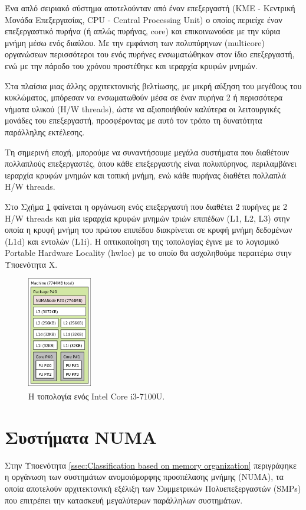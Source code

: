 Ένα απλό σειριακό σύστημα αποτελούνταν από έναν επεξεργαστή (ΚΜΕ - Κεντρική Μονάδα Επεξεργασίας, CPU - Central Processing Unit) ο οποίος περιείχε έναν επεξεργαστικό πυρήνα (ή απλώς πυρήνας, core) και επικοινωνούσε με την κύρια μνήμη μέσω ενός διαύλου. Με την εμφάνιση των πολυπύρηνων (multicore) οργανώσεων περισσότεροι του ενός πυρήνες ενσωματώθηκαν στον ίδιο επεξεργαστή, ενώ με την πάροδο του χρόνου προστέθηκε και ιεραρχία κρυφών μνημών.

Στα πλαίσια μιας άλλης αρχιτεκτονικής βελτίωσης, με μικρή αύξηση του μεγέθους του κυκλώματος, μπόρεσαν να ενσωματωθούν μέσα σε έναν πυρήνα 2 ή περισσότερα νήματα υλικού (H/W threads), ώστε να αξιοποιήθούν καλύτερα οι λειτουργικές μονάδες του επεξεργαστή, προσφέροντας με αυτό τον τρόπο τη δυνατότητα παράλληλης εκτέλεσης.

Τη σημερινή εποχή, μπορούμε να συναντήσουμε μεγάλα συστήματα που διαθέτουν πολλαπλούς επεξεργαστές, όπου κάθε επεξεργαστής είναι πολυπύρηνος, περιλαμβάνει ιεραρχία κρυφών μνημών και τοπική μνήμη, ενώ κάθε πυρήνας διαθέτει πολλαπλά H/W threads.

Στο Σχήμα \ref{fig:ideapad-topo} φαίνεται η οργάνωση ενός επεξεργαστή που διαθέτει 2 πυρήνες με 2 H/W threads και μία ιεραρχία κρυφών μνημών τριών επιπέδων (L1, L2, L3) στην οποία η κρυφή μνήμη του πρώτου επιπέδου διακρίνεται σε κρυφή μνήμη δεδομένων (L1d) και εντολών (L1i). Η οπτικοποίηση της τοπολογίας έγινε με το λογισμικό Portable Hardware Locality (hwloc) με το οποίο θα ασχοληθούμε περαιτέρω στην Υποενότητα Χ.

\begin{figure}[t]
	\centering
	\includegraphics[width=0.25\textwidth]{Figures/ideapad-topo.png}
	\linebreak
	\caption{Η τοπολογία ενός Intel\textsuperscript{\textregistered} Core\textsuperscript{\texttrademark} i3-7100U.}
	\label{fig:ideapad-topo}
\end{figure}


\section{Συστήματα NUMA}
\label{sec:NUMA Systems}
Στην Υποενότητα \ref{ssec:Classification based on memory organization} περιγράφηκε η οργάνωση των συστημάτων ανομοιόμορφης προσπέλασης μνήμης (NUMA), τα οποία αποτελούν αρχιτεκτονική εξέλιξη των Συμμετρικών Πολυεπεξεργαστών (SMPs) που επιτρέπει την κατασκευή μεγαλύτερων παράλληλων συστημάτων.

